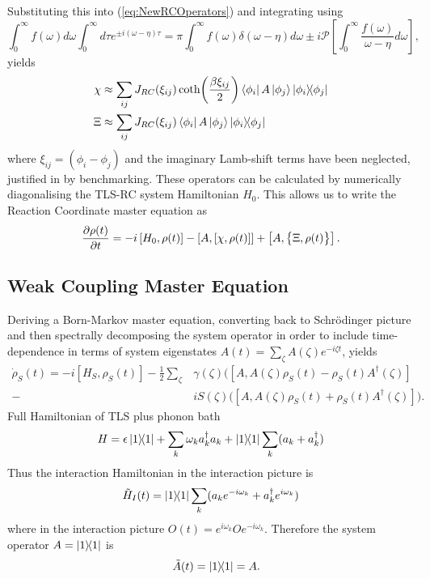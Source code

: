 \documentclass[]{article}
\begin{document}
Substituting this into (\ref{eq:NewRCOperators}) and integrating using 
\begin{equation}
	\label{eq:Sokhotski}
	\int_{0}^{\infty}f(\omega)d\omega\int_{0}^{\infty}d\tau e^{\pm i(\omega-\eta)\tau} = \pi\int_{0}^{\infty}f(\omega)\delta(\omega-\eta)d\omega \pm i \mathcal{P}\left[\int_{0}^{\infty}\frac{f(\omega)}{\omega-\eta}d\omega\right],
\end{equation}
yields
\begin{align}
	\label{eq:NewRCOperatorsDiscrete}
	\chi &\approx \sum_{ij}J_{RC}(\xi_{ij}) \coth(\frac{\beta \xi_{ij}}{2})\bra{\phi_i}A\ket{\phi_j}\dyad{\phi_i}{\phi_j}\\
	\Xi &\approx \sum_{ij}J_{RC}(\xi_{ij}) \bra{\phi_i}A\ket{\phi_j}\dyad{\phi_i}{\phi_j}
\end{align}
where $\xi_{ij} = (\phi_i-\phi_j)$ and the imaginary Lamb-shift terms have been neglected, justified in by benchmarking. These operators can be calculated by numerically diagonalising the TLS-RC system Hamiltonian $H_0$. This allows us to write the Reaction Coordinate master equation as
\begin{equation}
\pdv{\rho(t)}{t} = -i\left[H_0, \rho(t)\right] - \left[A, \left[\chi, \rho(t)\right]\right] + \left[A, \big\lbrace\Xi, \rho(t)\big\rbrace\right].
\end{equation}
\subsection{Weak Coupling Master Equation}
Deriving a Born-Markov master equation, converting back to Schr\"odinger picture and then spectrally decomposing the system operator in order to include time-dependence in terms of system eigenstates
$A(t)=\sum_{\zeta}A(\zeta)e^{-i\zeta t}$, yields
\begin{align}
\dot{\rho}_S(t) = -i[H_S, \rho_S(t)] -\frac{1}{2}\sum_{\zeta}&\gamma(\zeta)\big([A, A(\zeta)\rho_S(t)-\rho_S(t)A^{\dagger}(\zeta)]\\-&iS(\zeta)\big([A, A(\zeta)\rho_S(t)+\rho_S(t)A^{\dagger}(\zeta)]\big).
\end{align}
Full Hamiltonian of TLS plus phonon bath
\begin{equation}
H = \epsilon\dyad{1}{1} + \sum_{k}\omega_k a^{\dagger}_k a_k + \dyad{1}{1}\sum_{k} (a_k +a^{\dagger}_k) 
\end{equation}
Thus the interaction Hamiltonian in the interaction picture is
\begin{equation}
\tilde{H}_I(t) = \dyad{1}{1}\sum_{k} (a_ke^{-i\omega_k} +a^{\dagger}_ke^{i\omega_k}) 
\end{equation}
where in the interaction picture $O(t)=e^{i\omega_k}Oe^{-i\omega_k}$. Therefore the system operator $A = \dyad{1}$ is 
\begin{equation}
\quad \tilde{A}(t) = \dyad{1} = A.
\end{equation}
\end{document}
